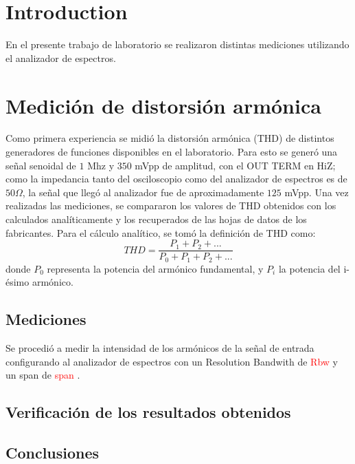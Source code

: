 \section{Introduction}

En el presente trabajo de laboratorio se realizaron distintas mediciones utilizando el analizador de espectros.

\section{Medición de distorsión armónica}
Como primera experiencia se midió la distorsión armónica (THD) de distintos generadores de funciones disponibles en el laboratorio. Para esto se generó una señal senoidal de $1$ Mhz y $350$ mVpp de amplitud, con el OUT TERM en HiZ; como la impedancia tanto del osciloscopio como del analizador de espectros es de $50 \Omega$, la señal que llegó al analizador fue de aproximadamente $125$ mVpp. Una vez realizadas las mediciones, se compararon los valores de THD obtenidos con los calculados analíticamente y los recuperados de las hojas de datos de los fabricantes. Para el cálculo analítico, se tomó la definición de THD como:
\begin{equation}
    THD=\frac{P_1+P_2+...}{P_0+P_1+P_2+...}
    \label{eq:THD}
\end{equation}
donde $P_0$ representa la potencia del armónico fundamental, y $P_i$ la potencia del i-ésimo armónico.

\subsection{Mediciones}
Se procedió a medir la intensidad de los armónicos de la señal de entrada configurando al analizador de espectros con un Resolution Bandwith de \textcolor{red}{Rbw} y un span de \textcolor{red}{span} .

\subsection{Verificación de los resultados obtenidos}

\subsection{Conclusiones}
